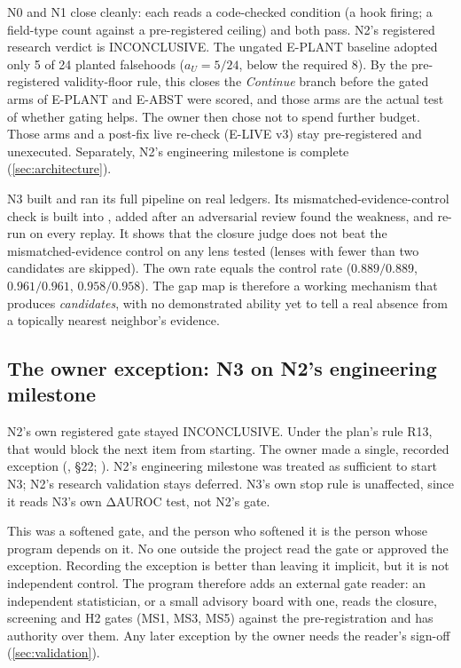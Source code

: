 N0 and N1 close cleanly: each reads a code-checked condition (a hook firing; a field-type count
against a pre-registered ceiling) and both pass. \evobs{} N2's registered research verdict is
INCONCLUSIVE. The ungated E-PLANT baseline adopted only 5 of 24 planted falsehoods
($a_U = 5/24$, below the required 8). By the pre-registered validity-floor rule, this closes the
\emph{Continue} branch before the gated arms of E-PLANT and E-ABST were scored, and those arms are
the actual test of whether gating helps. The owner then chose not to spend further budget. Those arms
and a post-fix live re-check (E-LIVE v3) stay pre-registered and unexecuted. Separately, N2's
engineering milestone is complete (\cref{sec:architecture}).

N3 built and ran its full pipeline on real ledgers. Its mismatched-evidence-control check is built into
, added after an adversarial review found the weakness, and re-run on every
replay. It shows that the closure judge does not beat the mismatched-evidence control on any lens
tested (lenses with fewer than two candidates are skipped). The own rate equals the control rate
($0.889/0.889$, $0.961/0.961$, $0.958/0.958$). The gap map is therefore a
working mechanism that produces \emph{candidates}, with no demonstrated ability yet to tell a real
absence from a topically nearest neighbor's evidence.

\subsection{The owner exception: N3 on N2's engineering milestone}\label{sec:owner-exception}

N2's own registered gate stayed INCONCLUSIVE. Under the plan's rule R13, that would block the next
item from starting. \evobs{} The owner made a single, recorded exception (,
\S22; ). N2's engineering milestone was treated as sufficient to start N3; N2's
research validation stays deferred. N3's own stop rule is unaffected, since it reads N3's own
ΔAUROC test, not N2's gate.

\evint{} This was a softened gate, and the person who softened it is the person whose program depends
on it. No one outside the project read the gate or approved the exception. Recording the exception is
better than leaving it implicit, but it is not independent control. The program therefore adds an
external gate reader: an independent statistician, or a small advisory board with one, reads the
closure, screening and H2 gates (MS1, MS3, MS5) against the pre-registration and has authority over
them. Any later exception by the owner needs the reader's sign-off (\cref{sec:validation}).

